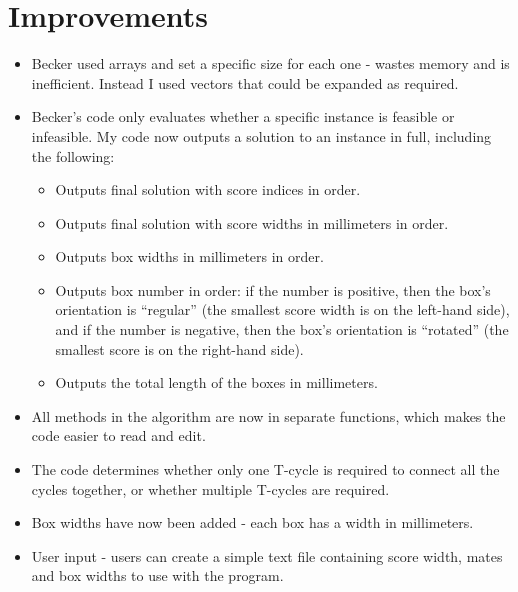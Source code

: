 \documentclass[a4paper, 11pt, twoside, onecolumn, openany]{article}
\begin{document}
\section{Improvements}
\begin{itemize}
	\item Becker used arrays and set a specific size for each one - wastes memory and is inefficient. Instead I used vectors that could be expanded as required.
	\item Becker's code only evaluates whether a specific instance is feasible or infeasible. My code now outputs a solution to an instance in full, including the following:
	\begin{itemize}
		\item Outputs final solution with score indices in order.
		\item Outputs final solution with score widths in millimeters in order.
		\item Outputs box widths in millimeters in order.
		\item Outputs box number in order: if the number is positive, then the box's orientation is ``regular'' (the smallest score width is on the left-hand side), and if the number is negative, then the box's orientation is ``rotated'' (the smallest score is on the right-hand side).
		\item Outputs the total length of the boxes in millimeters.
	\end{itemize}
	\item All methods in the algorithm are now in separate functions, which makes the code easier to read and edit.
	\item The code determines whether only one T-cycle is required to connect all the cycles together, or whether multiple T-cycles are required. 
	\item Box widths have now been added - each box has a width in millimeters.
	\item User input - users can create a simple text file containing score width, mates and box widths to use with the program.
	
	
	
\end{itemize}
\end{document}
